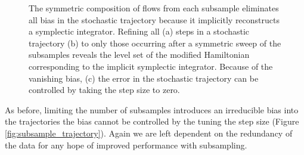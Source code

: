 \documentclass{article}
\begin{document}
\begin{figure}
\centering
{}
\caption{The symmetric composition of flows from each subsample eliminates
all bias in the stochastic trajectory because it implicitly reconstructs a symplectic
integrator.  Refining all (a) steps in a stochastic trajectory (b) to
only those occurring after a symmetric sweep of the subsamples reveals
the level set of the modified Hamiltonian corresponding to the implicit
symplectic integrator.  Because of the vanishing bias, (c) the error in the
stochastic trajectory can be controlled by taking the step size to zero. }
\label{fig:symmetric_stochastic}
\end{figure}

As before, limiting the number of subsamples introduces an irreducible bias
into the trajectories the bias cannot be controlled by the tuning the step size
(Figure \ref{fig:subsample_trajectory}).  Again we are left dependent on the 
redundancy of the data for any hope of improved performance with subsampling.
\end{document}
